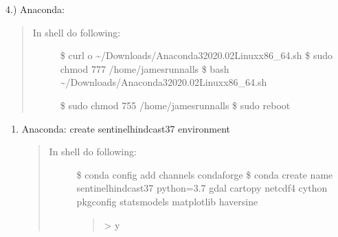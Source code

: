 \documentclass[letterpaper,10pt,english]{sphinxmanual}
\begin{document}
4.) Anaconda: 
\begin{quote}
\begin{description}
\item[{In shell do following:}] \leavevmode
\$ curl  \sphinxhyphen{}o \textasciitilde{}/Downloads/Anaconda3\sphinxhyphen{}2020.02\sphinxhyphen{}Linux\sphinxhyphen{}x86\_64.sh
\$ sudo chmod 777 /home/jamesrunnalls
\$ bash \textasciitilde{}/Downloads/Anaconda3\sphinxhyphen{}2020.02\sphinxhyphen{}Linux\sphinxhyphen{}x86\_64.sh

\begin{sphinxVerbatim}[commandchars=\\\{\}]
\PYG{p}{[}\PYG{p}{]}
\end{sphinxVerbatim}

\$ sudo chmod 755 /home/jamesrunnalls
\$ sudo reboot

\end{description}
\end{quote}
\begin{enumerate}
%
\setcounter{enumi}{4}
\item {} 
Anaconda: create sentinel\sphinxhyphen{}hindcast\sphinxhyphen{}37 environment
\begin{quote}
\begin{description}
\item[{In shell do following:}] \leavevmode
\$ conda config \textendash{}add channels conda\sphinxhyphen{}forge
\$ conda create \textendash{}name sentinel\sphinxhyphen{}hindcast\sphinxhyphen{}37 python=3.7 gdal cartopy netcdf4 cython pkgconfig statsmodels matplotlib haversine
\begin{quote}

\textgreater{} y
\end{quote}

\end{description}
\end{quote}

\end{enumerate}
\end{document}
